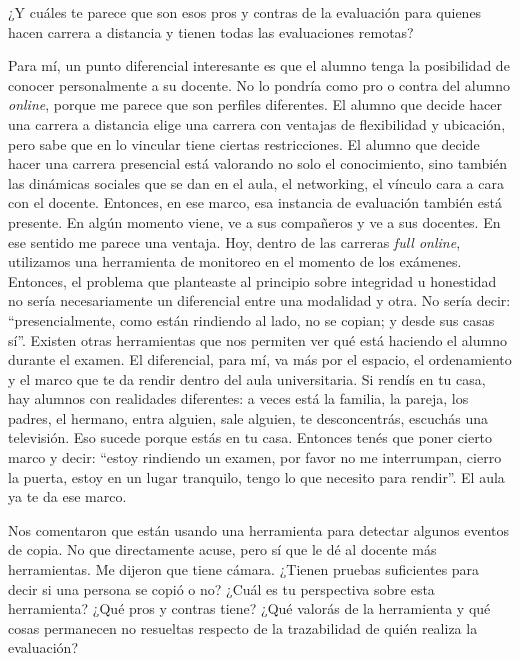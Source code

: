 \begin{description}[leftmargin=0cm, labelsep=0.5cm, style=nextline]
\item[\textbf{Entrevistadores:}] ¿Y cuáles te parece que son esos pros y contras de la evaluación para quienes hacen carrera a distancia y tienen todas las evaluaciones remotas?
\item[\textbf{Entrevistada:}] Para mí, un punto diferencial interesante es que el alumno tenga la posibilidad de conocer personalmente a su docente. No lo pondría como pro o contra del alumno \textit{online}, porque me parece que son perfiles diferentes.
El alumno que decide hacer una carrera a distancia elige una carrera con ventajas de flexibilidad y ubicación, pero sabe que en lo vincular tiene ciertas restricciones. El alumno que decide hacer una carrera presencial está valorando no solo el conocimiento, sino también las dinámicas sociales que se dan en el aula, el networking, el vínculo cara a cara con el docente. Entonces, en ese marco, esa instancia de evaluación también está presente.
En algún momento viene, ve a sus compañeros y ve a sus docentes. En ese sentido me parece una ventaja.
Hoy, dentro de las carreras \textit{full online}, utilizamos una herramienta de monitoreo en el momento de los exámenes. Entonces, el problema que planteaste al principio sobre integridad u honestidad no sería necesariamente un diferencial entre una modalidad y otra. No sería decir: ``presencialmente, como están rindiendo al lado, no se copian; y desde sus casas sí''. Existen otras herramientas que nos permiten ver qué está haciendo el alumno durante el examen.
El diferencial, para mí, va más por el espacio, el ordenamiento y el marco que te da rendir dentro del aula universitaria. Si rendís en tu casa, hay alumnos con realidades diferentes: a veces está la familia, la pareja, los padres, el hermano, entra alguien, sale alguien, te desconcentrás, escuchás una televisión. Eso sucede porque estás en tu casa. Entonces tenés que poner cierto marco y decir: ``estoy rindiendo un examen, por favor no me interrumpan, cierro la puerta, estoy en un lugar tranquilo, tengo lo que necesito para rendir''. El aula ya te da ese marco.
\item[\textbf{Entrevistadores:}] Nos comentaron que están usando una herramienta para detectar algunos eventos de copia. No que directamente acuse, pero sí que le dé al docente más herramientas. Me dijeron que tiene cámara. ¿Tienen pruebas suficientes para decir si una persona se copió o no? ¿Cuál es tu perspectiva sobre esta herramienta? ¿Qué pros y contras tiene? ¿Qué valorás de la herramienta y qué cosas permanecen no resueltas respecto de la trazabilidad de quién realiza la evaluación?

\end{description}
